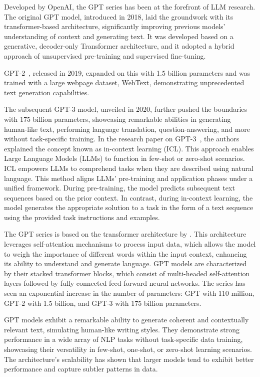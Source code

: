 Developed by OpenAI, the GPT series has been at the forefront of LLM research.
The original GPT model, introduced in 2018, laid the groundwork with its transformer-based architecture, significantly improving previous models' understanding of context and generating text.
It was developed based on a generative, decoder-only Transformer architecture, and it adopted a hybrid approach of unsupervised pre-training and supervised fine-tuning.

GPT-2~\cite{radford2019language}, released in 2019, expanded on this with 1.5 billion parameters and was trained with a large webpage dataset, WebText, demonstrating unprecedented text generation capabilities.

The subsequent GPT-3 model, unveiled in 2020, further pushed the boundaries with 175 billion parameters, showcasing remarkable abilities in generating human-like text, performing language translation, question-answering, and more without task-specific training.
In the research paper on GPT-3~\cite{brown2020language}, the authors explained the concept known as in-context learning (ICL). This approach enables Large Language Models (LLMs) to function in few-shot or zero-shot scenarios.
ICL empowers LLMs to comprehend tasks when they are described using natural language.
This method aligns LLMs' pre-training and application phases under a unified framework. During pre-training, the model predicts subsequent text sequences based on the prior context.
In contrast, during in-context learning, the model generates the appropriate solution to a task in the form of a text sequence using the provided task instructions and examples.

The GPT series is based on the transformer architecture by \textcite{vaswani2023attention}.
This architecture leverages self-attention mechanisms to process input data, which allows the model to weigh the importance of different words within the input context, enhancing its ability to understand and generate language.
GPT models are characterized by their stacked transformer blocks, which consist of multi-headed self-attention layers followed by fully connected feed-forward neural networks.
The series has seen an exponential increase in the number of parameters: GPT with 110 million, GPT-2 with 1.5 billion, and GPT-3 with 175 billion parameters.

GPT models exhibit a remarkable ability to generate coherent and contextually relevant text, simulating human-like writing styles.
They demonstrate strong performance in a wide array of NLP tasks without task-specific data training, showcasing their versatility in few-shot, one-shot, or zero-shot learning scenarios.
The architecture's scalability has shown that larger models tend to exhibit better performance and capture subtler patterns in data.

